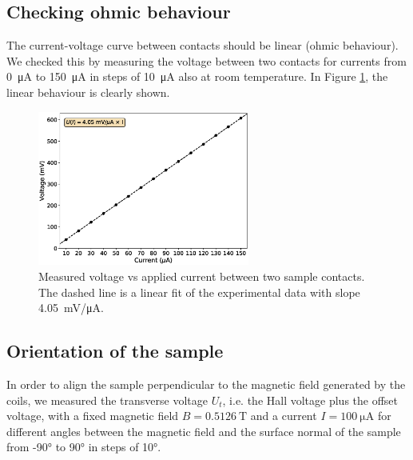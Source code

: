 \documentclass[11pt,a4paper]{article}
\begin{document}
\subsection{Checking ohmic behaviour}

The current-voltage curve between contacts should be linear (ohmic behaviour). We checked this by measuring the voltage between two contacts for currents from \SI{0}{\micro\ampere} to \SI{150}{\micro\ampere} in steps of \SI{10}{\micro\ampere} also at room temperature. In Figure \ref{fig:ohmic_check}, the linear behaviour is clearly shown.

\begin{figure}[H]
\centering
\includegraphics[width=0.62\textwidth]{Voltage_vs_current_ohmic_test.eps}
\caption{Measured voltage vs applied current between two sample contacts. The dashed line is a linear fit of the experimental data with slope \SI{4.05}{\milli\volt/\micro\ampere}.}
\label{fig:ohmic_check}
\end{figure}

\subsection{Orientation of the sample}

In order to align the sample perpendicular to the magnetic field generated by the coils, we measured the transverse voltage $U_t$, i.e. the Hall voltage plus the offset voltage, with a fixed magnetic field $B=\SI{0.5126}{\tesla}$ and a current $I=\SI{100}{\micro\ampere}$ for different angles between the magnetic field and the surface normal of the sample from \ang{-90} to \ang{90} in steps of \ang{10}.
\end{document}
